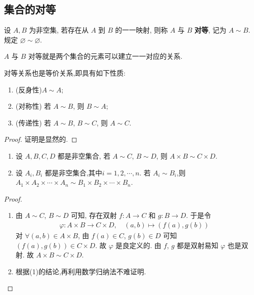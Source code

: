 \documentclass[../../main.tex]{subfiles}
\begin{document}
\subsection{集合的对等}

\begin{definition}[集合的对等]
设 $A, B$ 为非空集, 若存在从 $A$ 到 $B$ 的一一映射, 则称 $A$ 与 $B$ \textbf{对等}, 记为 $A \sim B$. 规定 $\varnothing \sim \varnothing$.
\end{definition}
\begin{note}
$A$ 与 $B$ 对等就是两个集合的元素可以建立一一对应的关系. 
\end{note}

\begin{theorem}\label{theorem:对等关系也是等价关系}
对等关系也是等价关系,即具有如下性质:
\begin{enumerate}[(1)]
\item (反身性)$A \sim A$;
\item (对称性) 若 $A \sim B$, 则 $B \sim A$;
\item (传递性) 若 $A \sim B$, $B \sim C$, 则 $A \sim C$.
\end{enumerate} 
\end{theorem}
\begin{proof}
证明是显然的.
\end{proof}

\begin{proposition}\label{proposition:对等集合的积也对等}
\begin{enumerate}[(1)]
\item 设 $A, B, C, D$ 都是非空集合, 若 $A \sim C$, $B \sim D$, 则 $A \times B \sim C \times D$.

\item 设 $A_i, B_i$ 都是非空集合,其中$i=1,2,\cdots,n$. 若 $A_i \sim B_i$,则 $A_1\times A_2\times \cdots \times A_n\sim B_1\times B_2\times \cdots \times B_n$.
\end{enumerate}
\end{proposition}
\begin{proof}
\begin{enumerate}[(1)]
\item 由 $A \sim C$, $B \sim D$ 可知, 存在双射 $f : A \rightarrow C$ 和 $g : B \rightarrow D$. 于是令
\begin{align*}
\varphi : A \times B \rightarrow C \times D, \quad (a, b) \mapsto (f(a), g(b))
\end{align*}
对 $\forall (a, b) \in A \times B$, 由 $f(a) \in C$, $g(b) \in D$ 可知 $(f(a), g(b)) \in C \times D$. 故 $\varphi$ 是良定义的. 由 $f$, $g$ 都是双射易知 $\varphi$ 也是双射. 故 $A \times B \sim C \times D$. 


\item 根据(1)的结论,再利用数学归纳法不难证明.
\end{enumerate}
\end{proof}
\end{document}
